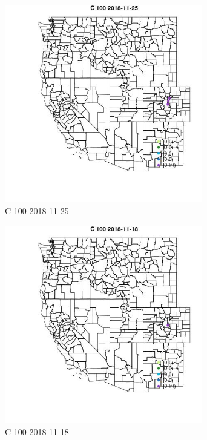 \begin{figure} 
\centering  
\includegraphics[width=0.77\textwidth]{Code_Outputs/Report_ML_input_PM25_Step4_part_e_de_duplicated_aveswNAs_MapObsC_1002018-11-25.jpg} 
\caption{\label{fig:Report_ML_input_PM25_Step4_part_e_de_duplicated_aveswNAsMapObsC_1002018-11-25}C 100 2018-11-25} 
\end{figure} 
 

\begin{figure} 
\centering  
\includegraphics[width=0.77\textwidth]{Code_Outputs/Report_ML_input_PM25_Step4_part_e_de_duplicated_aveswNAs_MapObsC_1002018-11-18.jpg} 
\caption{\label{fig:Report_ML_input_PM25_Step4_part_e_de_duplicated_aveswNAsMapObsC_1002018-11-18}C 100 2018-11-18} 
\end{figure} 
 

